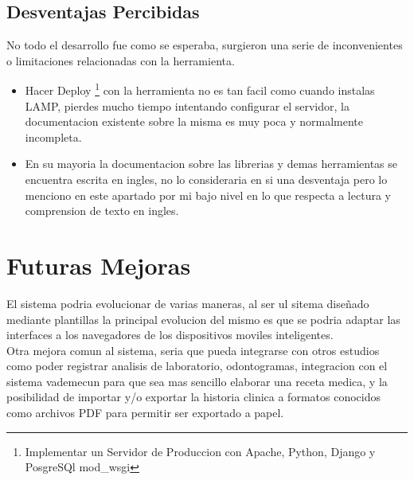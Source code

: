 \subsection{Desventajas Percibidas}

No todo el desarrollo fue como se esperaba, surgieron una serie de inconvenientes 
o limitaciones relacionadas con la herramienta.

\begin{itemize}
    \item Hacer Deploy \footnote{Implementar un Servidor de Produccion con 
        Apache, Python, Django y PosgreSQl mod\_wsgi} con la herramienta no es 
        tan facil como cuando instalas LAMP, pierdes mucho tiempo intentando 
        configurar el servidor, la documentacion existente sobre la misma es 
        muy poca y normalmente incompleta.

    \item En su mayoria la documentacion sobre las librerias y demas herramientas
        se encuentra escrita en ingles, no lo consideraria en si una desventaja 
        pero lo menciono en este apartado por mi bajo nivel en lo que respecta
        a lectura y comprension de texto en ingles.
\end{itemize}


\section{Futuras Mejoras}

El sistema podria evolucionar de varias maneras, al ser ul sitema diseñado 
mediante plantillas la principal evolucion del mismo es que se podria adaptar 
las interfaces a los navegadores de los dispositivos moviles inteligentes. \\[0.1cm]

Otra mejora comun al sistema, seria que pueda integrarse con otros estudios
como poder registrar analisis de laboratorio, odontogramas, integracion con 
el sistema vademecun para que sea mas sencillo elaborar una receta medica, 
y la posibilidad de importar y/o exportar la historia clinica a formatos 
conocidos como archivos PDF para permitir ser exportado a papel.

